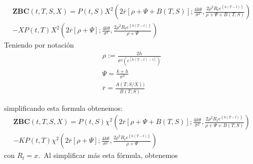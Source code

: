 \documentclass[11pt,notitlepage]{article}
\begin{document}
        \begin{align*}
    \mathbf{ZBC}\left ( t,T,S,X \right )=P(t,S)X^{2}\left ( 2\overline{r}[\rho +\Psi +B(T,S)];\frac{4k\theta }{\sigma ^{2}}, \frac{2\rho ^{2}R_{t}e^{\left \{ h(T-t) \right \}}}{\rho+ \Psi +B(T,S) } \right )\\ 
    -XP(t,T)X^{2}\left ( 2\overline{r}[\rho +\Psi];\frac{4k\theta }{\sigma ^{2}}, \frac{2\rho ^{2}R_{t}e^{\left \{ h(T-t) \right \}}}{\rho+ \Psi } \right )
             \end{align*}      
    Teniendo por notación 
    \begin{align*}
          \rho:= \frac{2h}{\sigma ^{2}\left ( e^{\left [ h(T-t)-1 \right ]} \right )} \\
        \Psi =\frac{k+h}{\sigma ^{2}}\\
        \overline{r}= \frac{A(T,S/X ))}{B(T,S)} 
\end{align*}
        
        
        simplificando esta formula obtenemos:
\begin{align*}
        \mathbf{ZBC}\left ( t,T,S,X \right )=P(t,S)\chi^{2}\left ( 2\overline{r}[\rho +\Psi +B(T,S)];\frac{4k\theta }{\sigma ^{2}}, \frac{2\rho ^{2}R_{t}e{^ \left \{ h(T-t) \right \}}}{\rho+ \Psi +B(T,S) } \right )\\ 
        -KP(t,T)\chi^{2}\left ( 2\overline{r}[\rho +\Psi];\frac{4k\theta }{\sigma ^{2}}, \frac{2\rho ^{2}R_{t}e^{\left \{ h(T-t) \right \}}}{\rho+ \Psi } \right )
\end{align*}
        con \(R_{t}=x\).\ Al simplificar más esta fórmula, obtenemos
        
\end{document}
